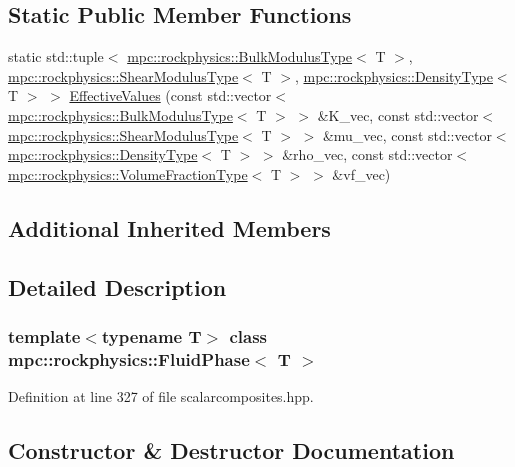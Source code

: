 \subsection*{Static Public Member Functions}
\begin{DoxyCompactItemize}
\item 
static std\+::tuple$<$ \mbox{\hyperlink{structmpc_1_1rockphysics_1_1_bulk_modulus_type}{mpc\+::rockphysics\+::\+Bulk\+Modulus\+Type}}$<$ T $>$, \mbox{\hyperlink{structmpc_1_1rockphysics_1_1_shear_modulus_type}{mpc\+::rockphysics\+::\+Shear\+Modulus\+Type}}$<$ T $>$, \mbox{\hyperlink{structmpc_1_1rockphysics_1_1_density_type}{mpc\+::rockphysics\+::\+Density\+Type}}$<$ T $>$ $>$ \mbox{\hyperlink{classmpc_1_1rockphysics_1_1_fluid_phase_a7f6accc4d8dfd7b8e6f55f3338698121}{Effective\+Values}} (const std\+::vector$<$ \mbox{\hyperlink{structmpc_1_1rockphysics_1_1_bulk_modulus_type}{mpc\+::rockphysics\+::\+Bulk\+Modulus\+Type}}$<$ T $>$ $>$ \&K\+\_\+vec, const std\+::vector$<$ \mbox{\hyperlink{structmpc_1_1rockphysics_1_1_shear_modulus_type}{mpc\+::rockphysics\+::\+Shear\+Modulus\+Type}}$<$ T $>$ $>$ \&mu\+\_\+vec, const std\+::vector$<$ \mbox{\hyperlink{structmpc_1_1rockphysics_1_1_density_type}{mpc\+::rockphysics\+::\+Density\+Type}}$<$ T $>$ $>$ \&rho\+\_\+vec, const std\+::vector$<$ \mbox{\hyperlink{structmpc_1_1rockphysics_1_1_volume_fraction_type}{mpc\+::rockphysics\+::\+Volume\+Fraction\+Type}}$<$ T $>$ $>$ \&vf\+\_\+vec)
\end{DoxyCompactItemize}
\subsection*{Additional Inherited Members}


\subsection{Detailed Description}
\subsubsection*{template$<$typename T$>$\newline
class mpc\+::rockphysics\+::\+Fluid\+Phase$<$ T $>$}



Definition at line 327 of file scalarcomposites.\+hpp.



\subsection{Constructor \& Destructor Documentation}
\mbox{\label{classmpc_1_1rockphysics_1_1_fluid_phase_a2705193cd79d12fd6bc9a39f0eee6898}} 

